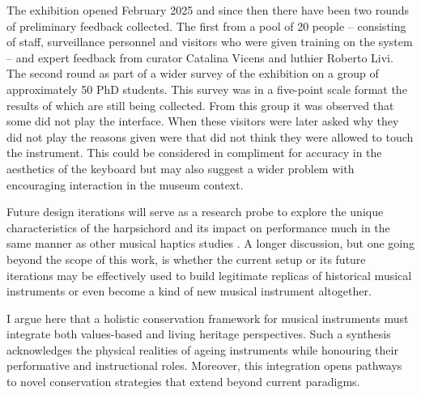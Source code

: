 The exhibition opened February 2025 and since then there have been two rounds of preliminary feedback collected. The first from a pool of 20 people -- consisting of staff, surveillance personnel and visitors who were given training on the system -- and expert feedback from curator Catalina Vicens and luthier Roberto Livi. The second round as part of a wider survey of the exhibition on a group of approximately 50 PhD students. This survey was in a five-point scale format the results of which are still being collected. From this group it was observed that some did not play the interface. When these visitors were later asked why they did not play the reasons given were that did not think they were allowed to touch the instrument. This could be considered in compliment for accuracy in the aesthetics of the keyboard but may also suggest a wider problem with  encouraging interaction in the museum context.

Future design iterations will serve as a research probe to explore the unique characteristics of the harpsichord and its impact on performance much in the same manner as other musical haptics studies \cite{charalampos-saitis_musical_2018}. A longer discussion, but one going beyond the scope of this work, is whether the current setup or its future iterations may be effectively used to build legitimate replicas of historical musical instruments or even become a kind of new musical instrument altogether.

I argue here that a holistic conservation framework for musical instruments must integrate both values-based and living heritage perspectives. Such a synthesis acknowledges the physical realities of ageing instruments while honouring their performative and instructional roles. Moreover, this integration opens pathways to novel conservation strategies that extend beyond current paradigms.
